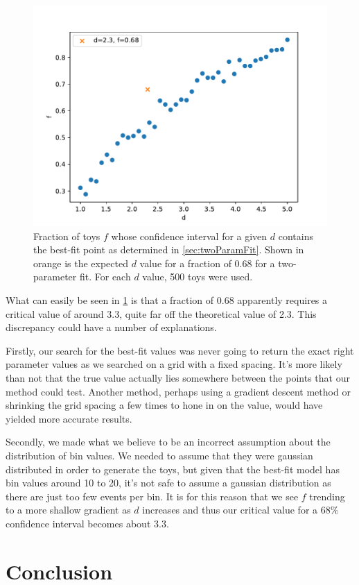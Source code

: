 \documentclass[11pt]{article}
\numberwithin{equation}{section}
\numberwithin{figure}{section}
\numberwithin{table}{section}
\begin{document}
\begin{figure}[h]
    \begin{center}
        \includegraphics[width=.8\textwidth]{Plots/d_f.pdf}
        \caption{Fraction of toys $f$ whose confidence interval for a given $d$ contains the best-fit point as determined in \cref{sec:twoParamFit}. Shown in orange is the expected $d$ value for a fraction of 0.68 for a two-parameter fit. For each $d$ value, 500 toys were used.}
        \label{fig:d_f}
    \end{center}
\end{figure}

What can easily be seen in \cref{fig:d_f} is that a fraction of 0.68 apparently requires a critical value of around 3.3, quite far off the theoretical value of 2.3. This discrepancy could have a number of explanations. 

Firstly, our search for the best-fit values was never going to return the exact right parameter values as we searched on a grid with a fixed spacing. It's more likely than not that the true value actually lies somewhere between the points that our method could test. Another method, perhaps using a gradient descent method or shrinking the grid spacing a few times to hone in on the value, would have yielded more accurate results. 

Secondly, we made what we believe to be an incorrect assumption about the distribution of bin values. We needed to assume that they were gaussian distributed in order to generate the toys, but given that the best-fit model has bin values around 10 to 20, it's not safe to assume a gaussian distribution as there are just too few events per bin. It is for this reason that we see $f$ trending to a more shallow gradient as $d$ increases and thus our critical value for a $68\%$ confidence interval becomes about 3.3. 

\section{Conclusion}\label{sec:Conclusion}



\newpage
\printbibliography
\end{document}

